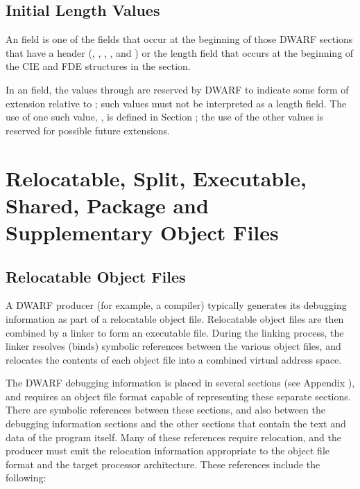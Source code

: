 \subsection{Initial Length Values}
\label{datarep:initiallengthvalues}

An  field 
is one of the fields that occur at the beginning 
of those DWARF sections that have a header
(\dotdebugaranges{}, 
\dotdebuginfo{}, 
\dotdebugline{},
\dotdebugloclists{},
\dotdebugnames{} and
\dotdebugrnglists) 
or the length field
that occurs at the beginning of the CIE and FDE structures
in the \dotdebugframe{} section.

In an  field, the values \wfffffffzero through
\wffffffff are reserved by DWARF to indicate some form of
extension relative to \DWARFVersionII; such values must not
be interpreted as a length field. The use of one such value,
\xffffffff, is defined in Section 
\db{}; 
the use of
the other values is reserved for possible future extensions.


\section{Relocatable, Split, Executable, Shared, Package and Supplementary Object Files} 
\label{datarep:executableobjectsandsharedobjects}

\subsection{Relocatable Object Files}
\label{datarep:relocatableobjectfiles}
A DWARF producer (for example, a compiler) typically generates its
debugging information as part of a relocatable object file.
Relocatable object files are then combined by a linker to form an
executable file. During the linking process, the linker resolves
(binds) symbolic references between the various object files, and
relocates the contents of each object file into a combined virtual
address space.

The DWARF debugging information is placed in several sections (see
Appendix ), and 
requires an object file format capable of
representing these separate sections. There are symbolic references
between these sections, and also between the debugging information
sections and the other sections that contain the text and data of the
program itself. Many of these references require relocation, and the
producer must emit the relocation information appropriate to the
object file format and the target processor architecture. These
references include the following:

